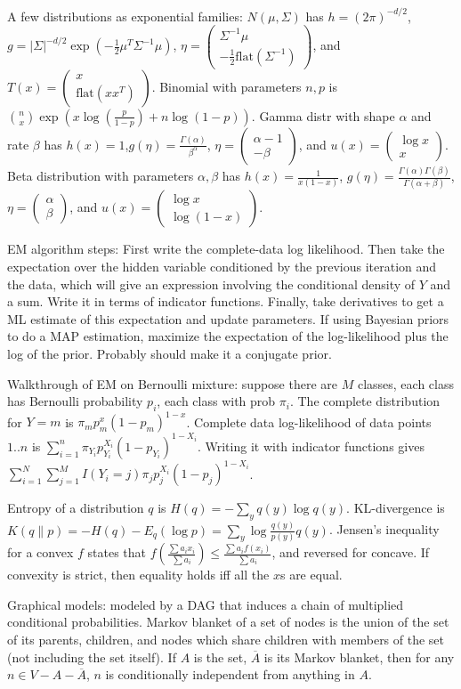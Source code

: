 \documentclass{article}
\newcommand{\conj}{\overline}
\newcommand{\openm}{\begin{pmatrix}}
\newcommand{\closem}{\end{pmatrix}}
\begin{document}
A few distributions as exponential families: $N(\mu,\Sigma)$ has $h=(2\pi)^{-d/2}$, $g=|\Sigma|^{-d/2}\exp(-\frac{1}{2}\mu^T\Sigma^{-1}\mu)$, $\eta=\openm\Sigma^{-1}\mu\\-\frac{1}{2}\text{flat}(\Sigma^{-1})\closem$, and $T(x)=\openm x\\\text{flat}(xx^T)\closem$. Binomial with parameters $n,p$ is $\binom{n}{x}\exp\left(x\log\left(\frac{p}{1-p}\right)+n\log(1-p)\right)$. Gamma distr with shape $\alpha$ and rate $\beta$ has $h(x)=1$,$g(\eta)=\frac{\Gamma(\alpha)}{\beta^\alpha}$, $\eta=\openm\alpha-1\\-\beta\closem$, and $u(x)=\openm\log x\\x\closem$. Beta distribution with parameters $\alpha,\beta$ has $h(x)=\frac{1}{x(1-x)}$, $g(\eta)=\frac{\Gamma(\alpha)\Gamma(\beta)}{\Gamma(\alpha+\beta)}$, $\eta=\openm\alpha\\\beta\closem$, and $u(x)=\openm\log x\\\log(1-x)\closem$.

EM algorithm steps: First write the complete-data log likelihood. Then take the expectation over the hidden variable conditioned by the previous iteration and the data, which will give an expression involving the conditional density of $Y$ and a sum. Write it in terms of indicator functions. Finally, take derivatives to get a ML estimate of this expectation and update parameters. If using Bayesian priors to do a MAP estimation, maximize the expectation of the log-likelihood plus the log of the prior. Probably should make it a conjugate prior.

Walkthrough of EM on Bernoulli mixture: suppose there are $M$ classes, each class has Bernoulli probability $p_i$, each class with prob $\pi_i$. The complete distribution for $Y=m$ is $\pi_mp_m^x(1-p_m)^{1-x}$. Complete data log-likelihood of data points $1..n$ is $\sum_{i=1}^n\pi_{Y_i}p_{Y_i}^{X_i}(1-p_{Y_i})^{1-X_i}$. Writing it with indicator functions gives $\sum_{i=1}^N\sum_{j=1}^MI(Y_i=j)\pi_jp_j^{X_i}(1-p_j)^{1-X_i}$. 

Entropy of a distribution $q$ is $H(q)=-\sum_yq(y)\log q(y)$. KL-divergence is $K(q\|p)=-H(q)-E_q(\log p)=\sum_y\log\frac{q(y)}{p(y)}q(y)$. Jensen's inequality for a convex $f$ states that $f\left(\frac{\sum a_ix_i}{\sum a_i}\right)\leq\frac{\sum a_if(x_i)}{\sum a_i}$, and reversed for concave. If convexity is strict, then equality holds iff all the $x$s are equal.

Graphical models: modeled by a DAG that induces a chain of multiplied conditional probabilities. Markov blanket of a set of nodes is the union of the set of its parents, children, and nodes which share children with members of the set (not including the set itself). If $A$ is the set, $\conj{A}$ is its Markov blanket, then for any $n\in V-A-\conj{A}$, $n$ is conditionally independent from anything in $A$.
\end{document}

